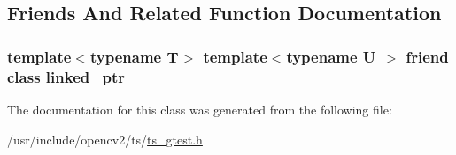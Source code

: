 \subsection{Friends And Related Function Documentation}
\hypertarget{classtesting_1_1internal_1_1linked__ptr_a7763f286ca03a7f7363a033d996c8c1c}{
\subsubsection[{linked\-\_\-ptr}]{\setlength{\rightskip}{0pt plus 5cm}template$<$typename T$>$ template$<$typename U $>$ friend class {\bf linked\-\_\-ptr}\hspace{0.3cm}{\ttfamily [friend]}}}\label{classtesting_1_1internal_1_1linked__ptr_a7763f286ca03a7f7363a033d996c8c1c}


The documentation for this class was generated from the following file\-:\begin{DoxyCompactItemize}
\item 
/usr/include/opencv2/ts/\hyperlink{ts__gtest_8h}{ts\-\_\-gtest.\-h}\end{DoxyCompactItemize}
